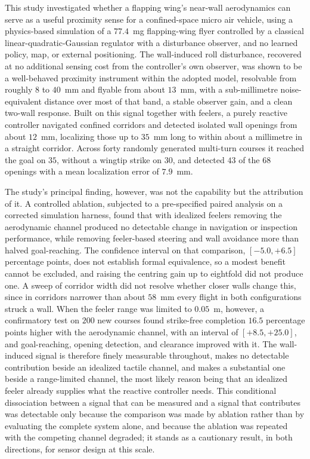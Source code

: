 \documentclass[final,5p,times]{elsarticle}
\begin{document}
This study investigated whether a flapping wing's near-wall aerodynamics can serve as a useful proximity sense for a confined-space micro air vehicle, using a physics-based simulation of a $77.4$~mg flapping-wing flyer controlled by a classical linear-quadratic-Gaussian regulator with a disturbance observer, and no learned policy, map, or external positioning. The wall-induced roll disturbance, recovered at no additional sensing cost from the controller's own observer, was shown to be a well-behaved proximity instrument within the adopted model, resolvable from roughly $8$ to $40$~mm and flyable from about $13$~mm, with a sub-millimetre noise-equivalent distance over most of that band, a stable observer gain, and a clean two-wall response. Built on this signal together with feelers, a purely reactive controller navigated confined corridors and detected isolated wall openings from about $12$~mm, localizing those up to $35$~mm long to within about a millimetre in a straight corridor. Across forty randomly generated multi-turn courses it reached the goal on $35$, without a wingtip strike on $30$, and detected $43$ of the $68$ openings with a mean localization error of $7.9$~mm.

The study's principal finding, however, was not the capability but the attribution of it. A controlled ablation, subjected to a pre-specified paired analysis on a corrected simulation harness, found that with idealized feelers removing the aerodynamic channel produced no detectable change in navigation or inspection performance, while removing feeler-based steering and wall avoidance more than halved goal-reaching. The confidence interval on that comparison, $[-5.0, +6.5]$ percentage points, does not establish formal equivalence, so a modest benefit cannot be excluded, and raising the centring gain up to eightfold did not produce one. A sweep of corridor width did not resolve whether closer walls change this, since in corridors narrower than about $58$~mm every flight in both configurations struck a wall. When the feeler range was limited to $0.05$~m, however, a confirmatory test on $200$ new courses found strike-free completion $16.5$ percentage points higher with the aerodynamic channel, with an interval of $[+8.5, +25.0]$, and goal-reaching, opening detection, and clearance improved with it. The wall-induced signal is therefore finely measurable throughout, makes no detectable contribution beside an idealized tactile channel, and makes a substantial one beside a range-limited channel, the most likely reason being that an idealized feeler already supplies what the reactive controller needs. This conditional dissociation between a signal that can be measured and a signal that contributes was detectable only because the comparison was made by ablation rather than by evaluating the complete system alone, and because the ablation was repeated with the competing channel degraded; it stands as a cautionary result, in both directions, for sensor design at this scale.
\end{document}
